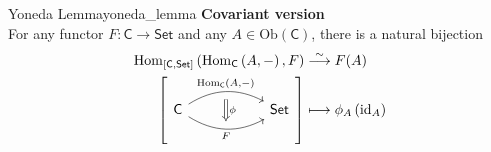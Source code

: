 \begin{theorem}{Yoneda Lemma}{yoneda_lemma}
    \textbf{Covariant version}\\
    For any functor $F:\mathsf{C}\to \mathsf{Set}$ and any $A\in \mathrm{Ob}(\mathsf{C})$, there is a natural bijection
    \begin{align*}
        \operatorname{Hom}_{\left[\mathsf{C},\mathsf{Set}\right]}\left(\operatorname{Hom}_{\mathsf{C}}\left(A,-\right), F\right) & \overset{\sim}{\longrightarrow} F(A) \\
        {  \left[ \begin{tikzcd}[ampersand replacement=\&]
            \mathsf{C} \arrow[r, "\operatorname{Hom}_{\mathsf{C}}\left(A{,}-\right)"{name=A, above}, bend left] \arrow[r, "F"'{name=B, below}, bend right] \&[+30pt] \mathsf{Set}
            \arrow[Rightarrow, shorten <=5.5pt, shorten >=5.5pt, from=A.south-|B, to=B, "\phi"]
        \end{tikzcd}\right] } & \longmapsto \phi_A\left(\operatorname{id}_A\right)
    \end{align*}
\end{theorem}

